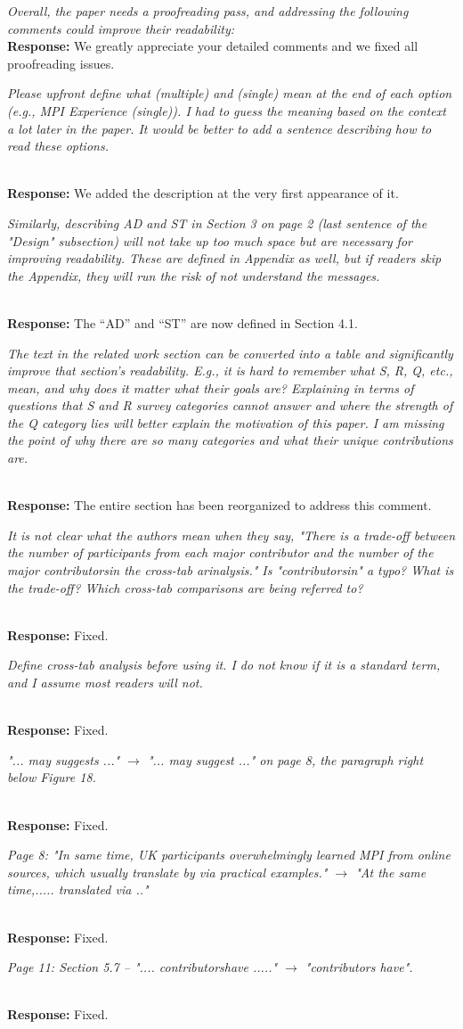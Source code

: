 \documentclass[11pt]{article}
\newcommand{\response}[2]{{\vspace{5mm}\noindent{\bf Comment:} \em #1}\\%
  {\bf Response:} #2}
\newcommand{\iresponse}[2]{{\item \em #1}\\%
  {\bf Response:} #2}
\begin{document}
\response{
Overall, the paper needs a proofreading pass, and addressing the
following comments could improve their readability:
}
{We greatly appreciate your detailed comments and we fixed all
  proofreading issues.}


\begin{enumerate}
\iresponse{Please upfront define what (multiple) and (single) mean at the end
of each option (e.g., MPI Experience (single)). I had to guess the
meaning based on the context a lot later in the paper. It would be
better to add a sentence describing how to read these
options.}
          {We added the description at the very first appearance of it.}

\iresponse{Similarly, describing AD and ST in Section 3 on page 2 (last
sentence of the "Design" subsection) will not take up too much space
but are necessary for improving readability. These are defined in
Appendix as well, but if readers skip the Appendix, they will run the
risk of not understand the messages.}
{The ``AD'' and ``ST'' are now defined
  in Section 4.1.}

\iresponse{The text in the related work section can be converted into a table
and significantly improve that section's readability. E.g., it is hard
to remember what S, R, Q, etc., mean, and why does it matter what
their goals are? Explaining in terms of questions that S and R survey
categories cannot answer and where the strength of the Q category lies
will better explain the motivation of this paper. I am missing the
point of why there are so many categories and what their unique
contributions are.}
{The entire section has been reorganized to address this comment.}

\iresponse{It is not clear what the authors mean when they say, "There is a
trade-off between the number of participants from each major
contributor and the number of the major contributorsin the cross-tab
arinalysis." Is "contributorsin" a typo? What is the trade-off? Which
cross-tab comparisons are being referred to? }
{Fixed.}

\iresponse{Define cross-tab analysis before using it. I do not know if it is a
standard term, and I assume most readers will not.}
{Fixed.}

\iresponse{"... may suggests ..." $\to$ "... may suggest ..." on page 8, the
  paragraph right below Figure 18.}
{Fixed.}

\iresponse{Page 8: "In same time, UK participants overwhelmingly learned MPI
from online sources, which usually translate by via practical
examples." $\to$ "At the same time,..... translated via .."}
{Fixed.}

\iresponse{Page 11: Section 5.7 -- ".... contributorshave ....." $\to$
  "contributors have".}
{Fixed.}

\end{enumerate}
\end{document}
